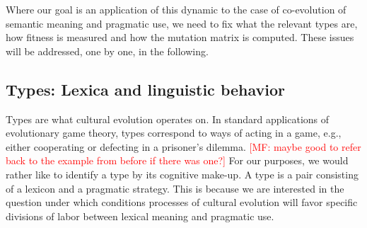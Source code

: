\documentclass[a4paper]{article}
\newcommand{\mf}[1]{\textcolor{Red}{[MF: #1]}}
\begin{document}
Where our goal is an application of this dynamic to the case of co-evolution of semantic
meaning and pragmatic use, we need to fix what the relevant types are, how fitness is measured
and how the mutation matrix is computed. These issues will be addressed, one by one, in the
following.

\subsection{Types: Lexica and linguistic behavior}
\label{sec:languages+use}

Types are what cultural evolution operates on. In standard applications of evolutionary game
theory, types correspond to ways of acting in a game, e.g., either cooperating or defecting in
a prisoner's dilemma. \mf{maybe good to refer back to the example from before if there was
  one?} For our purposes, we would rather like to identify a type by its cognitive make-up. A
type is a pair consisting of a lexicon and a pragmatic strategy. This is because we are
interested in the question under which conditions processes of cultural evolution will favor
specific divisions of labor between lexical meaning and pragmatic use. 
\end{document}
